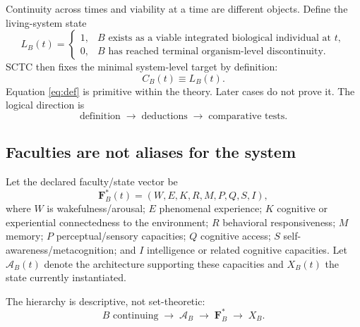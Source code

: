 Continuity across times and viability at a time are different objects. Define the living-system state
\begin{equation}
L_B(t)=
\begin{cases}
1, & B \text{ exists as a viable integrated biological individual at }t,\\
0, & B \text{ has reached terminal organism-level discontinuity.}
\end{cases}
\end{equation}
SCTC then fixes the minimal system-level target by definition:
\begin{equation}
\boxed{C_B(t)\equiv L_B(t).}
\label{eq:def}
\end{equation}
Equation \ref{eq:def} is primitive within the theory. Later cases do not prove it. The logical direction is
\begin{equation}
\text{definition}\;\rightarrow\;\text{deductions}\;\rightarrow\;\text{comparative tests}.
\end{equation}

\subsection{Faculties are not aliases for the system}
Let the declared faculty/state vector be
\begin{equation}
\mathbf F_B^*(t)=(W,E,K,R,M,P,Q,S,I),
\end{equation}
where $W$ is wakefulness/arousal; $E$ phenomenal experience; $K$ cognitive or experiential connectedness to the environment; $R$ behavioral responsiveness; $M$ memory; $P$ perceptual/sensory capacities; $Q$ cognitive access; $S$ self-awareness/metacognition; and $I$ intelligence or related cognitive capacities. Let $\mathcal A_B(t)$ denote the architecture supporting these capacities and $X_B(t)$ the state currently instantiated.

The hierarchy is descriptive, not set-theoretic:
\begin{equation}
B\text{ continuing}\;\longrightarrow\;\mathcal A_B\;\longrightarrow\;\mathbf F_B^*\;\longrightarrow\;X_B.
\end{equation}


